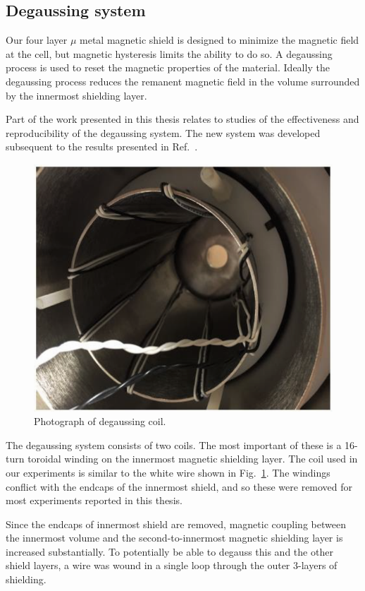 \subsection{Degaussing system\label{sec:Degaussing}}

Our four layer $\mu$ metal magnetic shield is designed to minimize the
magnetic field at the cell, but magnetic hysteresis limits the ability
to do so.  A degaussing process is used to reset the magnetic
properties of the material.  Ideally the degaussing process reduces
the remanent magnetic field in the volume surrounded by the innermost
shielding layer.

Part of the work presented in this thesis relates to studies of the
effectiveness and reproducibility of the degaussing system.  The new
system was developed subsequent to the results presented in
Ref.~\cite{Martin:2014foa}.

\begin{figure}%
\centering
\includegraphics[width=0.6\linewidth]{figures/degaussing_coil.png}
\caption{Photograph of degaussing coil.\label{fig:degaussing_coil}}
\end{figure}

The degaussing system consists of two coils.  The most important of
these is a 16-turn toroidal winding on the innermost magnetic
shielding layer.  The coil used in our experiments is similar to the
white wire shown in Fig.~\ref{fig:degaussing_coil}.  The windings
conflict with the endcaps of the innermost shield, and so these were
removed for most experiments reported in this thesis.

Since the endcaps of innermost shield are removed, magnetic coupling
between the innermost volume and the second-to-innermost magnetic
shielding layer is increased substantially.  To potentially be able to
degauss this and the other shield layers, a wire was wound in a single
loop through the outer 3-layers of shielding.

